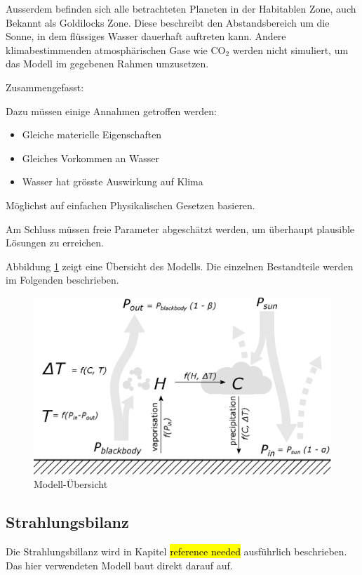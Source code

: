 \begin{refsection}
Ausserdem befinden sich alle betrachteten Planeten in der Habitablen Zone, auch Bekannt als Goldilocks Zone. Diese beschreibt den Abstandsbereich um die Sonne, in dem flüssiges Wasser dauerhaft auftreten kann.
	Andere klimabestimmenden atmosphärischen Gase wie $\text{CO}_\text{2}$ werden nicht simuliert, um das Modell im gegebenen Rahmen umzusetzen.


Zusammengefasst:

 Dazu müssen einige Annahmen getroffen werden:
\begin{itemize}
	\item Gleiche materielle Eigenschaften
	\item Gleiches Vorkommen an Wasser
	\item Wasser hat grösste Auswirkung auf Klima
\end{itemize}			
	
	
Möglichst auf einfachen Physikalischen Gesetzen basieren.	
	
	
Am Schluss müssen freie Parameter abgeschätzt werden, um überhaupt plausible Lösungen zu erreichen.


Abbildung \ref{planeten_model} zeigt eine Übersicht des Modells. Die einzelnen Bestandteile werden im Folgenden beschrieben.

\begin{figure}
	\centering
	\includegraphics[width=\textwidth]{planeten/Pictures/Model.eps}
	\caption{Modell-Übersicht}
	\label{planeten_model}
\end{figure}

\subsection{Strahlungsbilanz}
Die Strahlungsbillanz wird in Kapitel \hl{reference needed} ausführlich beschrieben. Das hier verwendeten Modell baut direkt darauf auf.


\end{refsection}
